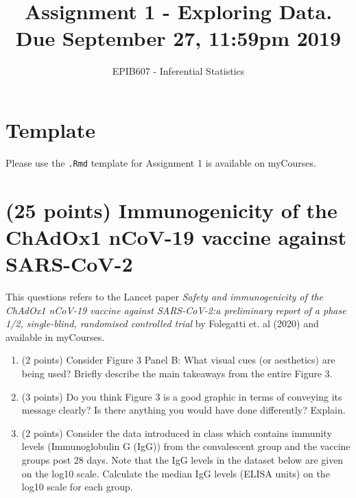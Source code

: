 \documentclass[letterpaper,12pt,twoside,]{pinp}
\title{Assignment 1 - Exploring Data. Due September 27, 11:59pm 2019}
\author[a]{EPIB607 - Inferential Statistics}
\affil[a]{Fall 2020, McGill University}
\providecommand{\tightlist}{%
  \setlength{\itemsep}{0pt}\setlength{\parskip}{0pt}}
\begin{document}
\verticaladjustment{-2pt}

\maketitle
\thispagestyle{firststyle}



\hypertarget{template}{%
\section*{Template}\label{template}}

Please use the \texttt{.Rmd} template for Assignment 1 is available on
myCourses.

\hypertarget{points-immunogenicity-of-the-chadox1-ncov-19-vaccine-against-sars-cov-2}{%
\section{(25 points) Immunogenicity of the ChAdOx1 nCoV-19 vaccine
against
SARS-CoV-2}\label{points-immunogenicity-of-the-chadox1-ncov-19-vaccine-against-sars-cov-2}}

This questions refers to the Lancet paper \emph{Safety and
immunogenicity of the ChAdOx1 nCoV-19 vaccine against SARS-CoV-2:a
preliminary report of a phase 1/2, single-blind, randomised controlled
trial} by Folegatti et. al (2020) and available in myCourses.

\begin{enumerate}
\def\labelenumi{\alph{enumi})}
\tightlist
\item
  (2 points) Consider Figure 3 Panel B: What visual cues (or aesthetics)
  are being used? Briefly describe the main takeaways from the entire
  Figure 3.
\item
  (3 points) Do you think Figure 3 is a good graphic in terms of
  conveying its message clearly? Is there anything you would have done
  differently? Explain.
\item
  (2 points) Consider the data introduced in class which contains
  immunity levels (Immunoglobulin G (IgG)) from the convalescent group
  and the vaccine groups post 28 days. Note that the IgG levels in the
  dataset below are given on the log10 scale. Calculate the median IgG
  levels (ELISA units) on the log10 scale for each group.
\end{enumerate}
\end{document}
